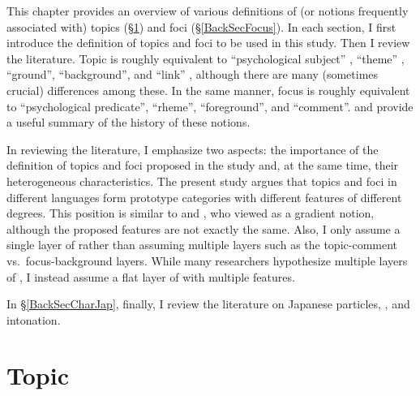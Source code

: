 This chapter provides an overview of various definitions of (or notions frequently associated with) topics (\S \ref{BackSecTopic}) and foci (\S \ref{BackSecFocus}).
In each section,
I first introduce the definition of topics and foci to be used in this study.
Then I review the literature.
Topic is roughly equivalent to ``psychological subject'' \cite{gabelentz69}, ``theme'' \cite[e.g.,][]{danes70,halliday04}, ``ground'', ``background'', and ``link'' \cite{vallduvi94},
although there are many (sometimes crucial) differences among these.
In the same manner,
focus is roughly equivalent to ``psychological predicate'', ``rheme'', ``foreground'', and ``comment''.
 and  provide a useful summary of the history of these notions.

In reviewing the literature,
I emphasize two aspects:
the importance of the definition of topics and foci proposed in the study and, at the same time,
their heterogeneous characteristics.
The present study argues that topics and foci in different languages form prototype categories with different features of different degrees.
This position is similar to  and ,
who viewed  as a gradient notion,
although the proposed features are not exactly the same.
Also, I only assume a single layer of 
rather than assuming multiple layers such as the topic-comment vs.~focus-background layers.
While many researchers hypothesize multiple layers of ,
I instead assume a flat layer of  with multiple features.


In \S \ref{BackSecCharJap}, finally,
I review the literature on Japanese particles, , and intonation.


\section{Topic}\label{BackSecTopic}

